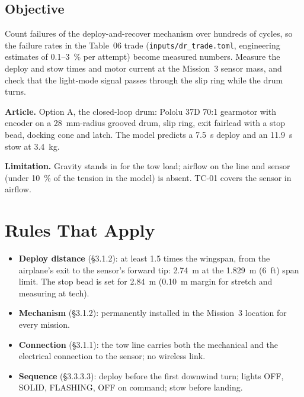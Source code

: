 \documentclass[final]{dbfdoc}
\begin{document}
\begin{frontmatter}
\section{Objective}
\noindent\begin{minipage}[t]{0.62\textwidth}
\setlength\parindent{1.15em}\noindent
Count failures of the deploy-and-recover mechanism over hundreds of cycles, so the failure rates in the Table~06 trade (\texttt{inputs/dr\_trade.toml}, engineering estimates of 0.1--3~\% per attempt) become measured numbers. Measure the deploy and stow times and motor current at the Mission~3 sensor mass, and check that the light-mode signal passes through the slip ring while the drum turns.

\noindent\textbf{Article.} Option A, the closed-loop drum: Pololu 37D 70:1 gearmotor with encoder on a 28~mm-radius grooved drum, slip ring, exit fairlead with a stop bead, docking cone and latch. The model predicts a 7.5~s deploy and an 11.9~s stow at 3.4~kg.

\noindent\textbf{Limitation.} Gravity stands in for the tow load; airflow on the line and sensor (under 10~\% of the tension in the model) is absent. TC-01 covers the sensor in airflow.
\end{minipage}\hfill
\begin{minipage}[t]{0.35\textwidth}
\vspace{-11pt}
\begin{dbfpanel}
\hfill{}\dbfreadoutgap
{}\hfill{}\dbfreadoutgap
{}\hfill{}
\end{dbfpanel}
\end{minipage}
\end{frontmatter}

\section{Rules That Apply}
\begin{itemize}
\item \textbf{Deploy distance} (§3.1.2): at least 1.5 times the wingspan, from the airplane's exit to the sensor's forward tip: 2.74~m at the 1.829~m (6~ft) span limit. The stop bead is set for 2.84~m (0.10~m margin for stretch and measuring at tech).
\item \textbf{Mechanism} (§3.1.2): permanently installed in the Mission~3 location for every mission.
\item \textbf{Connection} (§3.1.1): the tow line carries both the mechanical and the electrical connection to the sensor; no wireless link.
\item \textbf{Sequence} (§3.3.3.3): deploy before the first downwind turn; lights OFF, SOLID, FLASHING, OFF on command; stow before landing.
\end{itemize}
\end{document}
